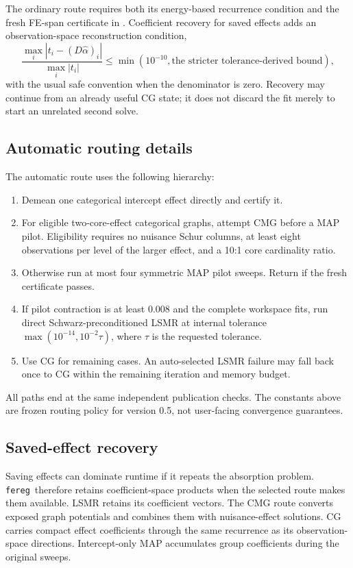 \documentclass[11pt]{article}
\newcommand{\fereg}{\texttt{fereg}}
\begin{document}
The ordinary route requires both its energy-based recurrence condition and
the fresh FE-span certificate in .  Coefficient
recovery for saved effects adds an observation-space reconstruction
condition,
\[
  \frac{\max_i|t_i-(D\widehat\alpha)_i|}
       {\max_i|t_i|}
  \leq \min(10^{-10},\text{the stricter tolerance-derived bound}),
\]
with the usual safe convention when the denominator is zero.  Recovery may
continue from an already useful CG state; it does not discard the fit merely
to start an unrelated second solve.

\subsection{Automatic routing details}

The automatic route uses the following hierarchy:
\begin{enumerate}
\item Demean one categorical intercept effect directly and certify it.
\item For eligible two-core-effect categorical graphs, attempt CMG before a
MAP pilot.  Eligibility requires no nuisance Schur columns, at least eight
observations per level of the larger effect, and a 10:1 core
cardinality ratio.
\item Otherwise run at most four symmetric MAP pilot sweeps.  Return if the
fresh certificate passes.
\item If pilot contraction is at least 0.008 and the complete workspace fits,
run direct Schwarz-preconditioned LSMR at internal tolerance
$\max(10^{-14},10^{-2}\tau)$, where $\tau$ is the requested tolerance.
\item Use CG for remaining cases.  An auto-selected LSMR failure may fall back
once to CG within the remaining iteration and memory budget.
\end{enumerate}
All paths end at the same independent publication checks.  The constants above
are frozen routing policy for version 0.5, not user-facing convergence
guarantees.

\subsection{Saved-effect recovery}

Saving effects can dominate runtime if it repeats the absorption problem.
\fereg\ therefore retains coefficient-space products when the selected route
makes them available.  LSMR retains its coefficient vectors.  The CMG route
converts exposed graph potentials and combines them with nuisance-effect
solutions.  CG carries compact effect coefficients through the same
recurrence as its observation-space directions.  Intercept-only MAP
accumulates group coefficients during the original sweeps.
\end{document}
